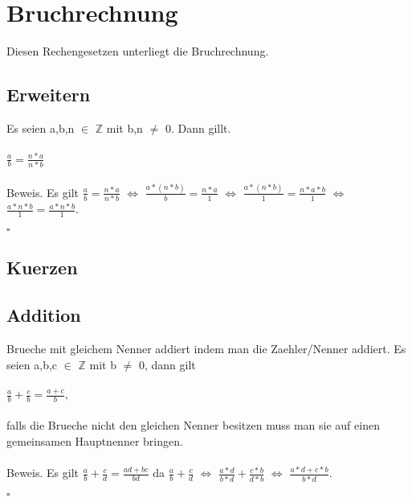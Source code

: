 \documentclass[../AbiMappe_Mathe.tex]{subfiles}
\begin{document}
\theoremstyle{nonumberplain}
\newtheorem{mytheo3}{Remark}
\section{Bruchrechnung}
Diesen Rechengesetzen unterliegt die Bruchrechnung.


\subsection{Erweitern}
Es seien a,b,n $\in$ $\mathds{Z}$ mit b,n $\neq$ 0. Dann gillt.\\\\\noindent\hspace*{10mm}%
$
	\frac{a}{b}=\frac{n*a}{n*b}
$\\\\
Beweis. Es gilt $\frac{a}{b}=\frac{n*a}{n*b}$ $\Leftrightarrow$  $\frac{a*(n*b)}{b}=\frac{n*a}{1}$  
$\Leftrightarrow$ $\frac{a*(n*b)}{1}=\frac{n*a*b}{1}$
$\Leftrightarrow$  $\frac{a*n*b}{1}=\frac{a*n*b}{1}$.
\begin{flushright}$\square$\end{flushright}


\subsection{Kuerzen}


\subsection{Addition}
Brueche mit gleichem Nenner addiert indem man die Zaehler/Nenner addiert.
Es seien a,b,c $\in$ $\mathds{Z}$ mit b $\neq$ 0, dann gilt\\\\\noindent\hspace*{10mm}%
$
	\frac{a}{b}+\frac{c}{b}=\frac{a+c}{b},
$\\\\
falls die Brueche nicht den gleichen Nenner besitzen muss man sie auf einen gemeinsamen Hauptnenner bringen.\\\\
Beweis. Es gilt $\frac{a}{b}+\frac{c}{d}=\frac{ad+bc}{bd}$ da $\frac{a}{b}+\frac{c}{d}$
$\Leftrightarrow$ $\frac{a*d}{b*d}+\frac{c*b}{d*b}$
$\Leftrightarrow$ $\frac{a*d+c*b}{b*d}$.
\begin{flushright}$\square$\end{flushright}
\end{document}
